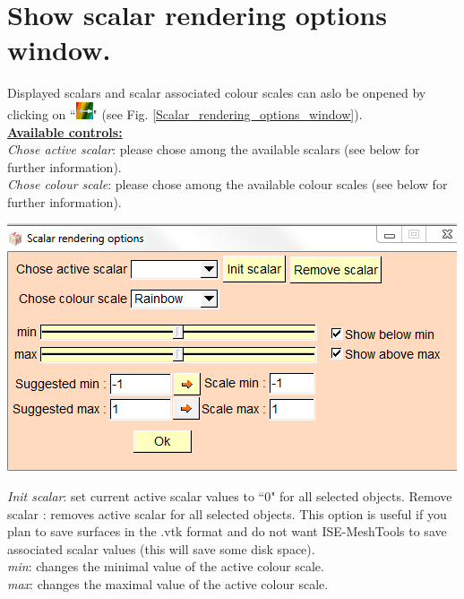 \section{Show scalar rendering options window.}
\noindent
\begin{minipage}{0.5\textwidth}
Displayed scalars and scalar associated
colour scales can aslo be onpened by
clicking on ``\includegraphics[scale=0.7]{images/pixmap/edit_color_scale.png}" (see Fig. \ref{Scalar_rendering_options_window}).\\
\noindent
\textbf{\underline{Available controls:}}\\
\textit{Chose active scalar}: please chose among
the available scalars (see below for further
information).\\
\textit{Chose colour scale}: please chose among
the available colour scales (see below for
further information).
\end{minipage}    
\begin{minipage}{0.5\textwidth}\centering
  \includegraphics[scale=0.5]{images/Scalars_renreding/Colour_scale_rendering_window.png}
\label{Scalar_rendering_options_window}
 \end{minipage} 
\noindent
\textit{Init scalar}: set current active scalar values to ``0" for all selected objects.
Remove scalar : removes active scalar for all selected objects. This option is useful if you plan to save surfaces in the .vtk format and do not want ISE-MeshTools to save associated scalar values (this will save some disk space).\\
\textit{min}: changes the minimal value of the active colour scale.\\
\textit{max}: changes the maximal value of the active colour scale.\\
